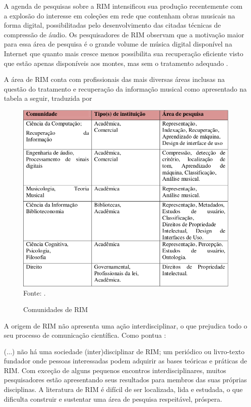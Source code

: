 A agenda de pesquisas sobre a RIM intensificou sua produção recentemente com a explosão do interesse em coleções em rede que contenham obras musicais na forma digital, possibilitadas pelo desenvolvimento das citadas técnicas de compressão de áudio. Os pesquisadores de RIM observam que a motivação maior para essa área de pesquisa é o grande volume de música digital disponível na Internet que quanto mais cresce menos possibilita sua recuperação eficiente visto que estão apenas disponíveis aos montes, mas sem o tratamento adequado \cite{gomes2015}.

A área de RIM conta com profissionais das mais diversas áreas inclusas na questão do tratamento e recuperação da informação musical como apresentado na tabela a seguir, traduzida por 

\begin{figure}[!htb]
   \centering
   \caption{Comunidades de RIM}\label{fig:comunidadeRim} 
   \includegraphics[scale=0.4]{figuras/comunidadeRim.png}
   Fonte: \cite{futrelle&downie2002}.
\end{figure}

A origem de RIM não apresenta uma ação interdisciplinar, o que prejudica todo o seu processo de comunicação científica. Como pontua :

\begin{citacao}
(...) não há uma sociedade (inter)disciplinar de RIM; um periódico ou livro-texto fundador onde pessoas interessadas podem adquirir as bases teóricas e práticas de RIM. Com exceção de alguns pequenos encontros interdisciplinares, muitos pesquisadores estão apresentando seus resultados para membros das suas próprias disciplinas. A literatura de RIM é difícil de ser localizada, lida e estudada, o que dificulta construir e sustentar uma área de pesquisa respeitável, próspera.
\end{citacao}

